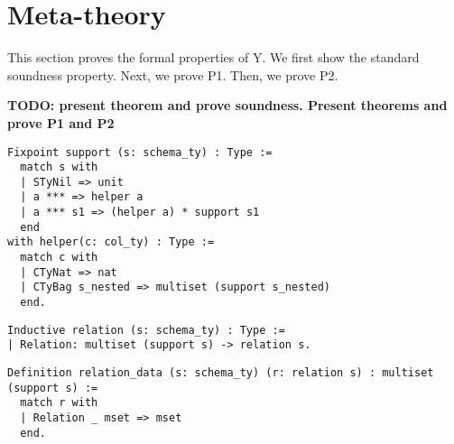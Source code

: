 \section{Meta-theory}
\label{sec:soundness}

This section proves the formal properties of Y. %
We first show the standard soundness property.
Next, we prove P1. Then, we prove P2. %

{\bf TODO: present theorem and prove soundness. Present theorems and prove P1 and P2}

\begin{lstlisting}
Fixpoint support (s: schema_ty) : Type :=
  match s with
  | STyNil => unit
  | a *** => helper a
  | a *** s1 => (helper a) * support s1
  end
with helper(c: col_ty) : Type :=
  match c with
  | CTyNat => nat
  | CTyBag s_nested => multiset (support s_nested)
  end.
\end{lstlisting}

\begin{lstlisting}
Inductive relation (s: schema_ty) : Type :=
| Relation: multiset (support s) -> relation s.
\end{lstlisting}

\begin{lstlisting}
Definition relation_data (s: schema_ty) (r: relation s) : multiset (support s) :=
  match r with
  | Relation _ mset => mset
  end.
\end{lstlisting}
